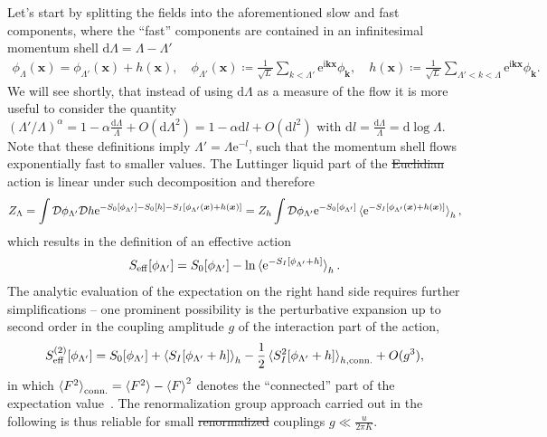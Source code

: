 \documentclass{svmono}
\def\ri{\mathrm i}
\def\re{\mathrm e}
\def\rd{\mathrm d}
\def\rD{\mathcal D}
\newcommand{\brlr}[1]{\left( #1 \right)}
\providecommand{\DIFaddtex}[1]{{\protect\color{blue}\uwave{#1}}} %
\providecommand{\DIFdeltex}[1]{{\protect\color{red}\sout{#1}}}                      %
\providecommand{\DIFaddbegin}{} %
\providecommand{\DIFaddend}{} %
\providecommand{\DIFdelbegin}{} %
\providecommand{\DIFdelend}{} %
\providecommand{\DIFadd}[1]{\texorpdfstring{\DIFaddtex{#1}}{#1}} %
\providecommand{\DIFdel}[1]{\texorpdfstring{\DIFdeltex{#1}}{}} %
\newcommand{\DIFscaledelfig}{0.5}
\newlength{\DIFdelgraphicswidth} %
\newlength{\DIFdelgraphicsheight} %
\newcommand{\DIFaddincludegraphics}[2][]{{\color{blue}\fbox{\DIFOincludegraphics[#1]{#2}}}} %
\newcommand{\DIFdelincludegraphics}[2][]{%
\sbox{\DIFdelgraphicsbox}{\DIFOincludegraphics[#1]{#2}}%
\settoboxwidth{\DIFdelgraphicswidth}{\DIFdelgraphicsbox} %
\settoboxtotalheight{\DIFdelgraphicsheight}{\DIFdelgraphicsbox} %
\scalebox{\DIFscaledelfig}{%
\parbox[b]{\DIFdelgraphicswidth}{\usebox{\DIFdelgraphicsbox}\\[-\baselineskip] \rule{\DIFdelgraphicswidth}{0em}}\llap{\resizebox{\DIFdelgraphicswidth}{\DIFdelgraphicsheight}{%
\setlength{\unitlength}{\DIFdelgraphicswidth}%
\begin{picture}(1,1)%
\thicklines\linethickness{2pt} %
{\color[rgb]{1,0,0}\put(0,0){\framebox(1,1){}}}%
{\color[rgb]{1,0,0}\put(0,0){\line( 1,1){1}}}%
{\color[rgb]{1,0,0}\put(0,1){\line(1,-1){1}}}%
\end{picture}%
}\hspace*{3pt}}} %
} %
\DeclareRobustCommand{\DIFaddbegin}{\DIFOaddbegin \let\includegraphics\DIFaddincludegraphics} %
\DeclareRobustCommand{\DIFaddend}{\DIFOaddend \let\includegraphics\DIFOincludegraphics} %
\DeclareRobustCommand{\DIFdelbegin}{\DIFOdelbegin \let\includegraphics\DIFdelincludegraphics} %
\DeclareRobustCommand{\DIFdelend}{\DIFOaddend \let\includegraphics\DIFOincludegraphics} %
\begin{document}
Let's start by splitting the fields into the aforementioned slow and fast components, where the ``fast'' components are contained in an infinitesimal momentum shell $\rd\Lambda=\Lambda-\Lambda'$
\begin{align}
    \phi_\Lambda({\bm x}) = \phi_{\Lambda'}({\bm x}) + h({\bm x}),
    \quad
    \phi_{\Lambda'}({\bm x})\coloneqq\frac1{\sqrt L}\sum_{k<\Lambda'}\re^{\ri {\bm k}{\bm x}}\phi_{\bm k},
    \quad
    h({\bm x}) \coloneqq \frac1{\sqrt L}\sum_{\Lambda'<k<\Lambda}\re^{\ri {\bm k}{\bm x}}\phi_{\bm k}.
\end{align}
We will see shortly, that instead of using $\rd\Lambda$ as a measure of the flow it is more useful to consider the quantity $\brlr{\Lambda'/\Lambda}^\alpha=1-\alpha\frac{\rd\Lambda}\Lambda + O(\rd\Lambda^2) = 1-\alpha\rd l + O(\rd l^2)$ with \DIFdelbegin \DIFdel{$\rd l =\frac{\rd\Lambda}\Lambda = \rd\log\Lambda$}\DIFdelend \DIFaddbegin \DIFadd{$\rd l =\frac{\rd\Lambda}\Lambda = \rd\ln\Lambda$}\DIFaddend .
Note that these definitions imply $\Lambda'=\Lambda\re^{-l}$, such that the momentum shell flows exponentially fast to smaller values.
The Luttinger liquid part of the \DIFdelbegin \DIFdel{Euclidian }\DIFdelend \DIFaddbegin \DIFadd{Euclidean }\DIFaddend action is linear under such decomposition and therefore
\begin{align}
    Z_\Lambda
    = \int\rD\phi_{\Lambda'}\rD h \re^{-S_0[\phi_{\Lambda'}]-S_0[h]-S_I[\phi_{\Lambda'}({\bm x}) + h({\bm x})]}
    = Z_h\int\rD\phi_{\Lambda'}\re^{-S_0[\phi_{\Lambda'}]}\braket{\re^{-S_I[\phi_{\Lambda'}({\bm x}) + h({\bm x})]}}_h,
\end{align}
which results in the definition of an effective action
\DIFdelbegin %
\DIFdelend \DIFaddbegin \begin{align}
    S_{\rm eff}[\phi_{\Lambda'}] = S_0[\phi_{\Lambda'}] - \ln\braket{\re^{-S_I[\phi_{\Lambda'}+h]}}_h.
\end{align}\DIFaddend 
The analytic evaluation of the expectation on the right hand side requires further simplifications -- one prominent possibility is the perturbative expansion up to second order in the coupling amplitude $g$ of the interaction part of the action,
\begin{align}
    S^{(2)}_{\rm eff}[\phi_{\Lambda'}] = S_0[\phi_{\Lambda'}] + \braket{S_I[\phi_{\Lambda'}+h]}_h - \frac12\braket{S^2_I[\phi_{\Lambda'}+h]}_{h,{\rm conn.}} + O(g^3),
\end{align}
in which $\braket{F^2}_{\rm conn.} = \braket{F^2}-\braket{F}^2$ denotes the ``connected'' part of the expectation value~\cite{Gogolin2004}.
The renormalization group approach carried out in the following is thus reliable for small \DIFdelbegin \DIFdel{renormalized }\DIFdelend couplings $g\ll \frac u{2\pi K}$.
\end{document}
